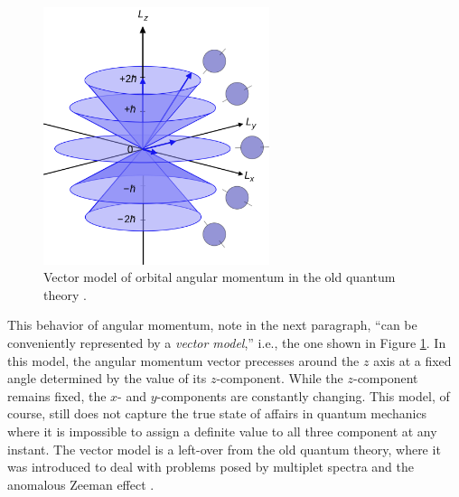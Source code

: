 \begin{figure}[h]
 \centering
   \includegraphics[width=2.6in]{Vector_model_of_orbital_angular_momentum.png} 
   \caption{Vector model of orbital angular momentum in the old quantum theory \citep[Wikimedia Commons; cf.][p.\ 258, Fig.\ 7-12]{Eisberg and Resnick 1985}. }
   \label{Vector_model_of_orbital_angular_momentum}
\end{figure}

This behavior of angular momentum,  \citet[pp.\ 258--259]{Eisberg and Resnick 1985} note in the next paragraph, ``can be conveniently represented by a \emph{vector model},'' i.e., the one shown in Figure \ref{Vector_model_of_orbital_angular_momentum}. In this model, the angular momentum vector precesses around the $z$ axis at a fixed angle determined by the value of its $z$-component. While the $z$-component remains fixed, the $x$- and $y$-components are constantly changing. This model, of course, still does not capture the true state of affairs in quantum mechanics where it is impossible to assign a definite value to all three component at any instant. The vector model is a left-over from the old quantum theory, where it was introduced to deal with problems posed by multiplet spectra and the anomalous Zeeman effect \citep[Sec.\ 1.3.6 and Ch.\ 7]{Duncan and Janssen 2019}.

